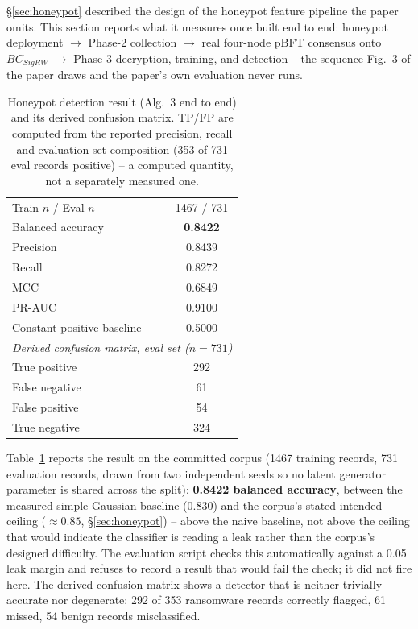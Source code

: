 \documentclass[conference]{IEEEtran}
\begin{document}
\S\ref{sec:honeypot} described the design of the honeypot feature pipeline the paper omits. This
section reports what it measures once built end to end: honeypot deployment $\to$ Phase-2
collection $\to$ real four-node pBFT consensus onto $BC_{SigRW}$ $\to$ Phase-3 decryption,
training, and detection -- the sequence Fig.~3 of the paper draws and the paper's own evaluation
never runs.

\begin{table}[t]
\centering
\caption{Honeypot detection result (Alg.\ 3 end to end) and its derived confusion matrix. TP/FP
are computed from the reported precision, recall and evaluation-set composition (353 of 731 eval
records positive) -- a computed quantity, not a separately measured one.}
\label{tab:honeypot}
\footnotesize
\begin{tabular}{lc}
\hline
Train $n$ / Eval $n$ & 1467 / 731 \\
Balanced accuracy & \textbf{0.8422} \\
Precision & 0.8439 \\
Recall & 0.8272 \\
MCC & 0.6849 \\
PR-AUC & 0.9100 \\
Constant-positive baseline & 0.5000 \\
\hline
\multicolumn{2}{c}{\textit{Derived confusion matrix, eval set ($n=731$)}} \\
\hline
True positive & 292 \\
False negative & 61 \\
False positive & 54 \\
True negative & 324 \\
\hline
\end{tabular}
\end{table}

Table~\ref{tab:honeypot} reports the result on the committed corpus (1467 training records, 731
evaluation records, drawn from two independent seeds so no latent generator parameter is shared
across the split): \textbf{0.8422 balanced accuracy}, between the measured simple-Gaussian
baseline (0.830) and the corpus's stated intended ceiling ($\approx0.85$, \S\ref{sec:honeypot})
-- above the naive baseline, not above the ceiling that would indicate the classifier is reading
a leak rather than the corpus's designed difficulty. The evaluation script checks this
automatically against a 0.05 leak margin and refuses to record a result that would fail the
check; it did not fire here. The derived confusion matrix shows a detector that is neither
trivially accurate nor degenerate: 292 of 353 ransomware records correctly flagged, 61 missed, 54
benign records misclassified.
\end{document}
